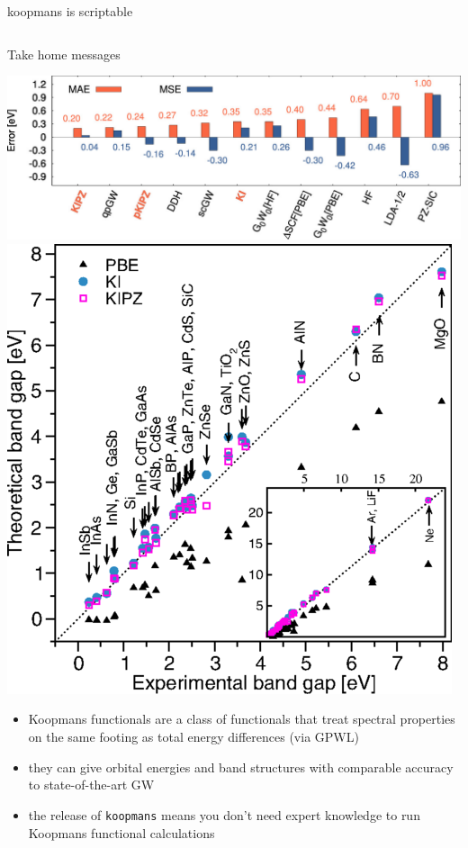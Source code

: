 \documentclass[xcolor=table,aspectratio=169]{beamer}
\numberwithin{equation}{section}
\begin{document}
\begin{frame}{koopmans is scriptable}
   \vspace{-2ex}
   \inputminted[fontsize=\scriptsize,breaklines]{python}{scripts/si.py}
\end{frame}

\begin{frame}{Take home messages}

   \includegraphics[height=0.2\paperheight]{figures/colonna_2019_gw100_ip.jpeg}
   \hfill
   \includegraphics[height=0.2\paperheight]{figures/fig_nguyen_prx_bandgaps.png}
   \hfill

   \begin{itemize}
      \item Koopmans functionals are a class of functionals that treat spectral properties on the same footing as total energy differences (via GPWL)
      \item they can give orbital energies and band structures with comparable accuracy to state-of-the-art GW
      \item the release of \texttt{koopmans} means you don't need expert knowledge to run Koopmans functional calculations
   \end{itemize}


\end{frame}
\end{document}
